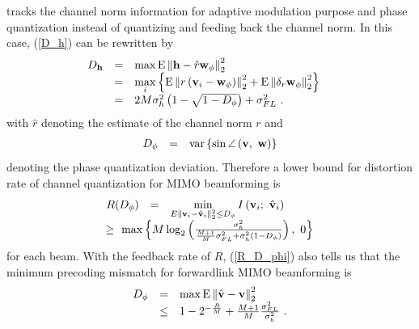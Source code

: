 \documentclass[10pt,fleqn, twocolumn]{IEEEtran}
\newcommand{\bh}{{\bf h}}
\newcommand{\bv}{{\bf v}}
\newcommand{\bw}{{\bf w}}
\begin{document}
tracks the channel norm information for adaptive modulation
purpose and phase quantization instead of quantizing and feeding
back the channel norm. In this case, (\ref{D_h}) can be rewritten
by
\begin{equation}\hspace{-0.15in}
\begin{array}{rcl}
D_{\bh}&=&\max{\rm E}\left\|\bh-\hat{r}{\bw}_{\phi}\right\|_{2}^{2}\\
&=&\max\limits_{i}\left\{{\rm E}\left\|r\left(\bv_{i}-{\bw}_{\phi}\right)\right\|_{2}^{2}+{\rm E}\left\|\delta_{r}{\bw}_{\phi}\right\|_{2}^{2}\right\}\\
&=&2M\sigma_{h}^{2}\left(1-\sqrt{1-D_{\phi}}\right)+\sigma_{\mbox{\tiny
FL}}^{2}\ .
\end{array}\label{D_h2}
\end{equation}
\noindent with $\hat{r}$ denoting the estimate of the channel norm
$r$ and
\begin{equation}%
\begin{array}{rcl}
D_{\phi}&=&{\rm var}\left\{\sin\angle\left(\bv,\
\bw\right)\right\}
\end{array}
\end{equation}
\noindent denoting the phase quantization deviation. Therefore a
lower bound for distortion rate of channel quantization for MIMO
beamforming is
\begin{equation}%
\begin{array}{rcl}
R(D_{\phi})&=&\min\limits_{E\|\bv_{i}-\hat{\bv}_{i}\|_{2}^{2}\leq
D_{\phi}} I\left(\bv_{i};\
\hat{\bv}_{i}\right)\\
&\hspace{-1.10in}\geq&\hspace{-0.60in}\max\left\{
M\log_{2}\left(\frac{\sigma_{h}^{2}}{\frac{M+1}{M}\sigma_{\mbox{\tiny
FL}}^{2}+\sigma_{h}^{2}\left(1-D_{\phi}\right)}\right),\ 0\right\}
\end{array}\label{R_D_phi}
\end{equation}
\noindent for each beam. With the feedback rate of $R$,
(\ref{R_D_phi}) also tells us that the minimum precoding mismatch
for forwardlink MIMO beamforming is
\begin{equation}%
\begin{array}{rcl}
D_{\phi}&=&\max{\rm E}\left\|\hat{\bv}-\bv\right\|_{2}^{2}\\
 &\leq&1-2^{-\frac{R}{M}}+\frac{M+1}{M}\frac{\sigma_{\mbox{\tiny
FL}}^{2}}{\sigma_{h}^{2}}\ .
\end{array}\label{D_phi}
\end{equation}
\end{document}
